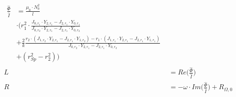 \begin{align}
    \label{eq:hohlzylinder:phiNormExact}
    \begin{split}
    \frac{\hat{\Phi}}{\hat{I}} & = \frac{\mu_0 \cdot N_0^2}{l} \\
                               & \cdot \Biggl( r_1^2 \cdot \frac{J_{0,r_1} \cdot Y_{2,r_1} - J_{2,r_1} \cdot Y_{0,r_1}}{J_{0,r_2} \cdot Y_{2,r_1} - J_{2,r_1} \cdot Y_{0,r_2}} \\
                               & + \frac{2}{k} \frac{r_2 \cdot (J_{1,r_2} \cdot Y_{2,r_1} - J_{2,r_1} \cdot Y_{1,r_2}) - r_1 \cdot (J_{1,r_1} \cdot Y_{2,r_1} - J_{2,r_1} \cdot Y_{1,r_1})}{J_{0,r_2} \cdot Y_{2,r_1} - J_{2,r_1} \cdot Y_{0,r_2}} \\
                               & + (r_{Sp}^2 - r_2^2) \Biggr)
    \end{split} \\
    L & = Re \Biggl(\frac{\hat{\Phi}}{\hat{I}} \Biggr) \\
    R & = - \omega \cdot Im \Biggl(\frac{\hat{\Phi}}{\hat{I}} \Biggr) + R_{\Omega,0}
\end{align}

